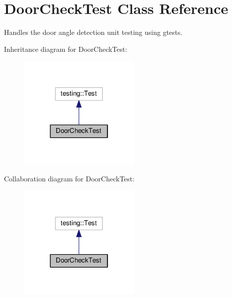\hypertarget{classDoorCheckTest}{\section{Door\-Check\-Test Class Reference}
\label{classDoorCheckTest}
}


Handles the door angle detection unit testing using gtests.  




Inheritance diagram for Door\-Check\-Test\-:
\nopagebreak
\begin{figure}[H]
\begin{center}
\leavevmode
\includegraphics[width=166pt]{classDoorCheckTest__inherit__graph}
\end{center}
\end{figure}


Collaboration diagram for Door\-Check\-Test\-:
\nopagebreak
\begin{figure}[H]
\begin{center}
\leavevmode
\includegraphics[width=166pt]{classDoorCheckTest__coll__graph}
\end{center}
\end{figure}
